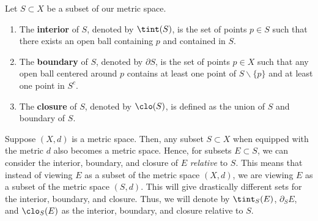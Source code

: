 \documentclass[11pt]{article}
\begin{document}
    \begin{defn}
        Let $S \subset X$ be a subset of our metric space. 
        \begin{enumerate}[label = (\roman*)]
            \item The \textbf{interior} of $S$, denoted by $\tint (S)$, is the set of points $p \in S$ such that there exists an open ball containing $p$ and contained in $S$.

            \item The \textbf{boundary} of $S$, denoted by $\partial S$, is the set of points $p \in X$ such that any open ball centered around $p$ contains at least one point of $S \backslash \{p\}$ and at least one point in $S^c$. 

            \item The \textbf{closure} of $S$, denoted by $\clo (S)$, is defined as the union of $S$ and boundary of $S$. 
        \end{enumerate} 
    \end{defn} 
    \begin{remark}
        Suppose $(X, d)$ is a metric space. Then, any subset $S \subset X$ when equipped with the metric $d$ also becomes a metric space. Hence, for subsets $E \subset S$, we can consider the interior, boundary, and closure of $E$ \textit{relative} to $S$. This means that instead of viewing $E$ as a subset of the metric space $(X, d)$, we are viewing $E$ as a subset of the metric space $(S, d)$. This will give drastically different sets for the interior, boundary, and closure. Thus, we will denote by $\tint_S(E)$, $\partial_S E$, and $\clo_S(E)$ as the interior, boundary, and closure relative to $S$. 
    \end{remark}
\end{document}
